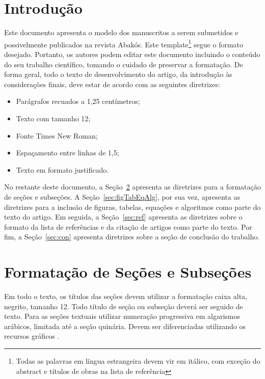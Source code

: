 \documentclass[a4paper,12pt]{article}
\begin{document}
\newpage

 \onehalfspace  %
 \setlength{\parindent}{1.25cm}


\section{Introdução}

Este documento apresenta o modelo dos manuscritos a serem submetidos e possivelmente publicados na revista Abakós. Este template\footnote{Todas as palavras em língua estrangeira devem vir em itálico, com exceção do abstract e títulos de obras na lista de referência} segue o formato desejado. Portanto, os autores podem editar este documento incluindo o conteúdo do seu trabalho científico, tomando o cuidado de preservar a formatação.
De forma geral, todo o texto de desenvolvimento do artigo, da introdução às considerações finais, deve estar de acordo com as seguintes diretrizes:
\begin{itemize}
    \item Parágrafos recuados a 1,25 centímetros;
    \item Texto com tamanho 12;
    \item Fonte Times New Roman;
    \item Espaçamento entre linhas de 1,5;
    \item Texto em formato justificado.
\end{itemize}

No restante deste documento, a Seção~\ref{sec:sec} apresenta as diretrizes para a formatação de seções e subseções. A Seção~\ref{sec:figTabEqAlg}, por sua vez, apresenta as diretrizes para a inclusão de figuras, tabelas, equações e algoritmos como parte do texto do artigo. Em seguida, a Seção~\ref{sec:ref} apresenta as diretrizes sobre o formato da lista de referências e da citação de artigos como parte do texto. Por fim, a Seção~\ref{sec:con} apresenta diretrizes sobre a seção de conclusão do trabalho.


\section{Formatação de Seções e Subseções}
\label{sec:sec}

Em todo o texto, os títulos das seções devem utilizar a formatação caixa alta, negrito, tamanho 12. Todo título de seção ou subseção deverá ser seguido de texto. Para as seções textuais utilizar numeração progressiva em algarismos arábicos, limitada até a seção quinária. Devem ser diferenciadas utilizando os recursos gráficos \cite{manualpucartigo}.
\end{document}
